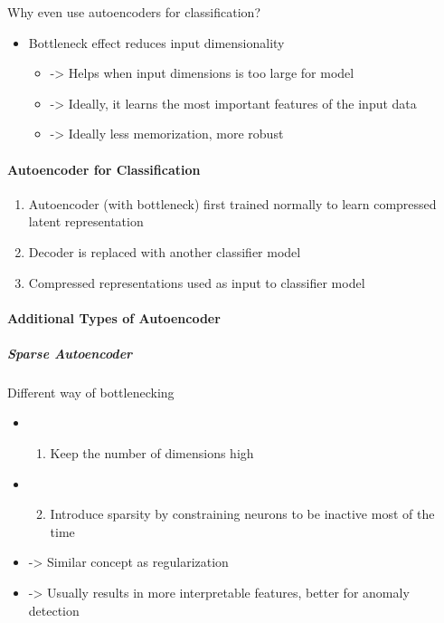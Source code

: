 \documentclass[
]{article}
\providecommand{\tightlist}{%
  \setlength{\itemsep}{0pt}\setlength{\parskip}{0pt}}
\begin{document}
Why even use autoencoders for classification?

\begin{itemize}
\tightlist
\item
  Bottleneck effect reduces input dimensionality

  \begin{itemize}
  \tightlist
  \item
    -\textgreater{} Helps when input dimensions is too large for model
  \item
    -\textgreater{} Ideally, it learns the most important features of
    the input data
  \item
    -\textgreater{} Ideally less memorization, more robust
  \end{itemize}
\end{itemize}

\paragraph{Autoencoder for
Classification}\label{autoencoder-for-classification}

\begin{enumerate}
\tightlist
\item
  Autoencoder (with bottleneck) first trained normally to learn
  compressed latent representation
\item
  Decoder is replaced with another classifier model
\item
  Compressed representations used as input to classifier model
\end{enumerate}

\paragraph{Additional Types of
Autoencoder}\label{additional-types-of-autoencoder}

\subparagraph{Sparse Autoencoder}\label{sparse-autoencoder}

Different way of bottlenecking

\begin{itemize}
\tightlist
\item
  \begin{enumerate}
  \tightlist
  \item
    Keep the number of dimensions high
  \end{enumerate}
\item
  \begin{enumerate}
  \setcounter{enumi}{1}
  \tightlist
  \item
    Introduce sparsity by constraining neurons to be inactive most of
    the time
  \end{enumerate}
\item
  -\textgreater{} Similar concept as regularization
\item
  -\textgreater{} Usually results in more interpretable features, better
  for anomaly detection
\end{itemize}
\end{document}
